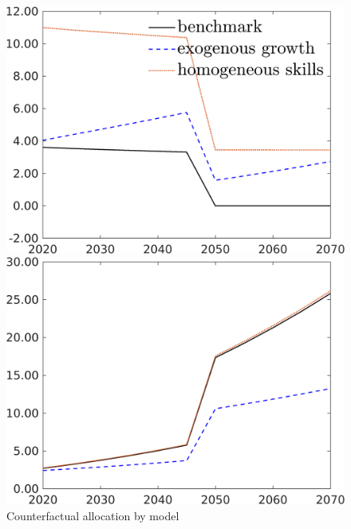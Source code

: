 \begin{figure}[h!!]
	\centering
	\caption{Counterfactual allocation by model }\label{fig:count_mod_allo}
	\begin{minipage}[]{0.32\textwidth}
		\includegraphics[width=1\textwidth]{../../codding_model/own_basedOnFried/optimalPol_190722_tidiedUp/figures/all_10Aout22/CountMod1_target_Emnet_regime3_spillover0_sep1_extern0_PV1_etaa0.79_lgd1.png}
	\end{minipage}
\begin{minipage}[]{0.32\textwidth}
	\includegraphics[width=1\textwidth]{../../codding_model/own_basedOnFried/optimalPol_190722_tidiedUp/figures/all_10Aout22/CountMod1_target_GFF_regime3_spillover0_sep1_extern0_PV1_etaa0.79_lgd0.png}

\end{minipage}
\end{figure}
